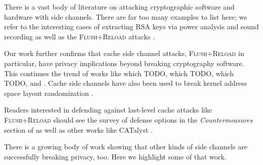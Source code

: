 \documentclass[letterpaper,twocolumn,10pt]{article}
\begin{document}
There is a vast body of literature on attacking cryptographic software and
hardware with side channels. There are far too many examples to list here; we
refer to the interesting cases of extracting RSA keys via power analysis
\cite{messerges1999power} and sound recording \cite{genkin2013rsa} as well as
the \textsc{Flush+Reload} attacks \cite{yarom2013flush, benger2014ooh,
yarom2014recovering}.

Our work further confirms that cache side channel attacks, \textsc{Flush+Reload}
in particular, have privacy implications beyond breaking cryptography software.
This continues the trend of works like \cite{zhang2014cross} which TODO,
\cite{gruss2015cache} which TODO, \cite{oren2015spy} which TODO, and
\cite{lipp2015armageddon}.  Cache side channels have also been used to break
kernel address space layout randomization \cite{hund2013practical}.

Readers interested in defending against last-level cache attacks like
\textsc{Flush+Reload} should see the survey of defense options in the
\emph{Countermeasures} section of \cite{gruss2015cache} as well as other works
like CATalyst \cite{liu2016catalyst}.

There is a growing body of work showing that other kinds of side channels are
successfully breaking privacy, too. Here we highlight some of that work.
\end{document}
